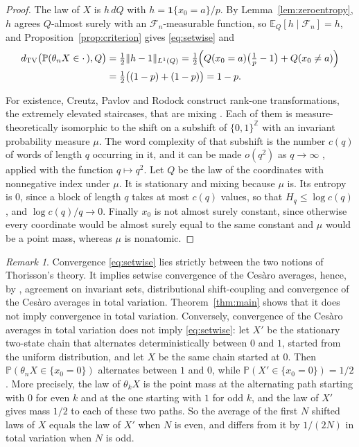 \documentclass[11pt]{amsart}
\theoremstyle{definition}
\theoremstyle{remark}
\newtheorem{remark}[theorem]{Remark}
\newcommand{\Z}{\mathbb Z}
\newcommand{\E}{\mathbb E}
\newcommand{\Prob}{\mathbb P}
\newcommand{\cF}{\mathcal F}
\newcommand{\dtv}{d_{\mathrm{TV}}}
\newcommand{\one}{\mathbf 1}
\begin{document}
\begin{proof}
The law of $X$ is $h\,dQ$ with $h=\one\{x_0=a\}/p$. By Lemma~\ref{lem:zeroentropy}, $h$ agrees $Q$-almost surely with
an $\cF_n$-measurable function, so $\E_Q[h\mid\cF_n]=h$, and Proposition~\ref{prop:criterion} gives
\eqref{eq:setwise} and
\begin{align*}
\dtv\bigl(\Prob(\theta_nX\in\cdot\,),Q\bigr)&=\tfrac12\|h-1\|_{L^1(Q)}
=\tfrac12\Bigl(Q(x_0=a)\bigl(\tfrac1p-1\bigr)+Q(x_0\ne a)\Bigr)\\
&=\tfrac12\bigl((1-p)+(1-p)\bigr)=1-p .
\end{align*}

For existence, Creutz, Pavlov and Rodock \cite{CPR23} construct rank-one transformations, the extremely elevated
staircases, that are mixing \cite[Theorem~3.1]{CPR23}. Each of them is
measure-theoretically isomorphic to the shift on a subshift of $\{0,1\}^\Z$ with an invariant probability measure
$\mu$. The word complexity of that subshift is the number $c(q)$ of words of length $q$ occurring in it, and it can be
made $o(q^2)$ as $q\to\infty$ \cite[Theorem~4.1]{CPR23}, applied with the function $q\mapsto q^2$. Let $Q$ be the law of the coordinates with nonnegative index under $\mu$. It is
stationary and mixing because $\mu$ is. Its entropy is $0$, since a block of length $q$ takes at most $c(q)$ values,
so that $H_q\le\log c(q)$, and $\log c(q)/q\to0$. Finally $x_0$ is not almost surely constant, since
otherwise every coordinate would be almost surely equal to the same constant and $\mu$ would be a point mass, whereas
$\mu$ is nonatomic.
\end{proof}

\begin{remark}\label{rem:position}
Convergence \eqref{eq:setwise} lies strictly between the two notions of Thorisson's theory. It implies setwise
convergence of the Ces\`aro averages, hence, by \cite[Corollary~3.1]{ThoPre}, agreement on invariant sets, distributional
shift-coupling and convergence of the Ces\`aro averages in total variation. Theorem~\ref{thm:main} shows that it does not
imply convergence in total variation. Conversely, convergence of the Ces\`aro averages in total variation does not imply
\eqref{eq:setwise}: let $X'$ be the stationary two-state chain that alternates deterministically between $0$ and $1$,
started from the uniform distribution, and let $X$ be the same chain started at $0$. Then $\Prob(\theta_nX\in\{x_0=0\})$
alternates between $1$ and $0$, while $\Prob(X'\in\{x_0=0\})=1/2$. More precisely, the law of $\theta_kX$ is the point
mass at the alternating path starting with $0$ for even $k$ and at the one starting with $1$ for odd $k$, and the law
of $X'$ gives mass $1/2$ to each of these two paths. So the average of the first $N$ shifted laws of
$X$ equals the law of $X'$ when $N$ is even, and differs from it by $1/(2N)$ in total variation when $N$ is odd.
\end{remark}
\end{document}
